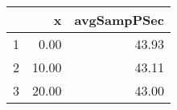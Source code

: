 \begin{table}[h]
\centering
\begin{tabular}{rrr}
  \hline
 & x & avgSampPSec \\ 
  \hline
1 & 0.00 & 43.93 \\ 
   \hline
2 & 10.00 & 43.11 \\ 
   \hline
3 & 20.00 & 43.00 \\ 
   \hline
\end{tabular}
\end{table}
